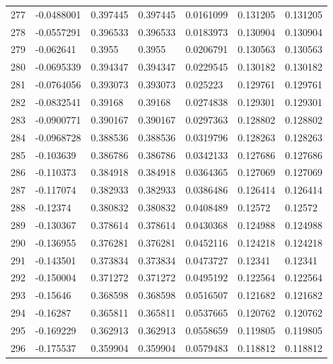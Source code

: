 \begin{longtable}{l|lll|lll}
 277 & -0.0488001   & 0.397445    & 0.397445    &  0.0161099   & 0.131205    & 0.131205    \\
 278 & -0.0557291   & 0.396533    & 0.396533    &  0.0183973   & 0.130904    & 0.130904    \\
 279 & -0.062641    & 0.3955      & 0.3955      &  0.0206791   & 0.130563    & 0.130563    \\
 280 & -0.0695339   & 0.394347    & 0.394347    &  0.0229545   & 0.130182    & 0.130182    \\
 281 & -0.0764056   & 0.393073    & 0.393073    &  0.025223    & 0.129761    & 0.129761    \\
 282 & -0.0832541   & 0.39168     & 0.39168     &  0.0274838   & 0.129301    & 0.129301    \\
 283 & -0.0900771   & 0.390167    & 0.390167    &  0.0297363   & 0.128802    & 0.128802    \\
 284 & -0.0968728   & 0.388536    & 0.388536    &  0.0319796   & 0.128263    & 0.128263    \\
 285 & -0.103639    & 0.386786    & 0.386786    &  0.0342133   & 0.127686    & 0.127686    \\
 286 & -0.110373    & 0.384918    & 0.384918    &  0.0364365   & 0.127069    & 0.127069    \\
 287 & -0.117074    & 0.382933    & 0.382933    &  0.0386486   & 0.126414    & 0.126414    \\
 288 & -0.12374     & 0.380832    & 0.380832    &  0.0408489   & 0.12572     & 0.12572     \\
 289 & -0.130367    & 0.378614    & 0.378614    &  0.0430368   & 0.124988    & 0.124988    \\
 290 & -0.136955    & 0.376281    & 0.376281    &  0.0452116   & 0.124218    & 0.124218    \\
 291 & -0.143501    & 0.373834    & 0.373834    &  0.0473727   & 0.12341     & 0.12341     \\
 292 & -0.150004    & 0.371272    & 0.371272    &  0.0495192   & 0.122564    & 0.122564    \\
 293 & -0.15646     & 0.368598    & 0.368598    &  0.0516507   & 0.121682    & 0.121682    \\
 294 & -0.16287     & 0.365811    & 0.365811    &  0.0537665   & 0.120762    & 0.120762    \\
 295 & -0.169229    & 0.362913    & 0.362913    &  0.0558659   & 0.119805    & 0.119805    \\
 296 & -0.175537    & 0.359904    & 0.359904    &  0.0579483   & 0.118812    & 0.118812    \\

\end{longtable}

